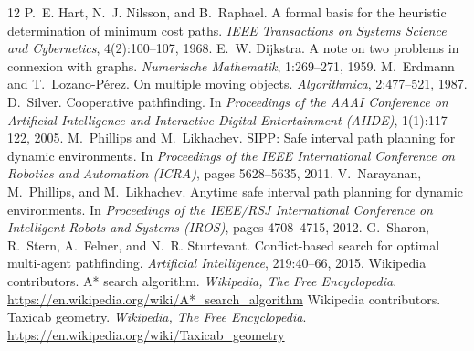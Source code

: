 \documentclass[10pt,letterpaper]{article}
\begin{document}
\begin{thebibliography}{12}\small
\setlength{\itemsep}{2pt}
 P.~E. Hart, N.~J. Nilsson, and B.~Raphael. A formal basis for the heuristic determination of minimum cost paths. \emph{IEEE Transactions on Systems Science and Cybernetics}, 4(2):100--107, 1968.
 E.~W. Dijkstra. A note on two problems in connexion with graphs. \emph{Numerische Mathematik}, 1:269--271, 1959.
 M.~Erdmann and T.~Lozano-P\'erez. On multiple moving objects. \emph{Algorithmica}, 2:477--521, 1987.
 D.~Silver. Cooperative pathfinding. In \emph{Proceedings of the AAAI Conference on Artificial Intelligence and Interactive Digital Entertainment (AIIDE)}, 1(1):117--122, 2005.
 M.~Phillips and M.~Likhachev. SIPP: Safe interval path planning for dynamic environments. In \emph{Proceedings of the IEEE International Conference on Robotics and Automation (ICRA)}, pages 5628--5635, 2011.
 V.~Narayanan, M.~Phillips, and M.~Likhachev. Anytime safe interval path planning for dynamic environments. In \emph{Proceedings of the IEEE/RSJ International Conference on Intelligent Robots and Systems (IROS)}, pages 4708--4715, 2012.
 G.~Sharon, R.~Stern, A.~Felner, and N.~R. Sturtevant. Conflict-based search for optimal multi-agent pathfinding. \emph{Artificial Intelligence}, 219:40--66, 2015.
 Wikipedia contributors. A* search algorithm. \emph{Wikipedia, The Free Encyclopedia}. \url{https://en.wikipedia.org/wiki/A*_search_algorithm}
 Wikipedia contributors. Taxicab geometry. \emph{Wikipedia, The Free Encyclopedia}. \url{https://en.wikipedia.org/wiki/Taxicab_geometry}
\end{thebibliography}
\end{document}
